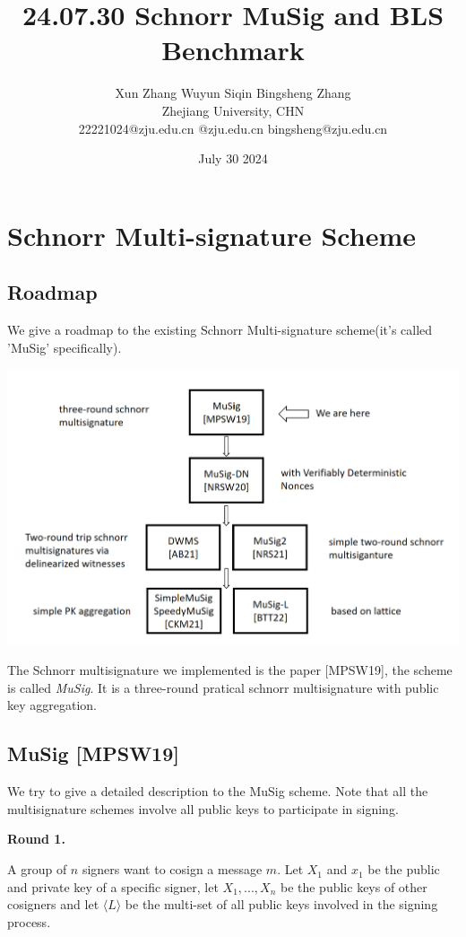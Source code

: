 \documentclass{article}
\title{24.07.30 Schnorr MuSig and BLS Benchmark}
\author{Xun Zhang \quad \quad Wuyun Siqin \quad \quad Bingsheng Zhang \\ 
Zhejiang University, CHN \\
22221024@zju.edu.cn \quad 3210101763@zju.edu.cn \quad bingsheng@zju.edu.cn}
\date{July 30 2024}
\begin{document}
\maketitle

\section{Schnorr Multi-signature Scheme}

\subsection{Roadmap}

We give a roadmap to the existing Schnorr Multi-signature scheme(it's called 'MuSig' specifically).

\includegraphics[width=1\linewidth]{roadmap.png}

The Schnorr multisignature we implemented is the paper [MPSW19], the scheme is called \textit{MuSig}. It is a three-round pratical schnorr multisignature with public key aggregation.

\subsection{MuSig [MPSW19]}

We try to give a detailed description to the MuSig scheme. Note that all the multisignature schemes involve all public keys to participate in signing.


\textbf{Round 1.}

A group of $n$ signers want to cosign a message $m$. Let 
$X_1$ and $x_1$ be the public and private key of a specific signer, let $X_1, ... , X_n$ be the public keys of other cosigners and let $\langle L \rangle$ be the multi-set of all public keys involved in the signing process.
\end{document}
